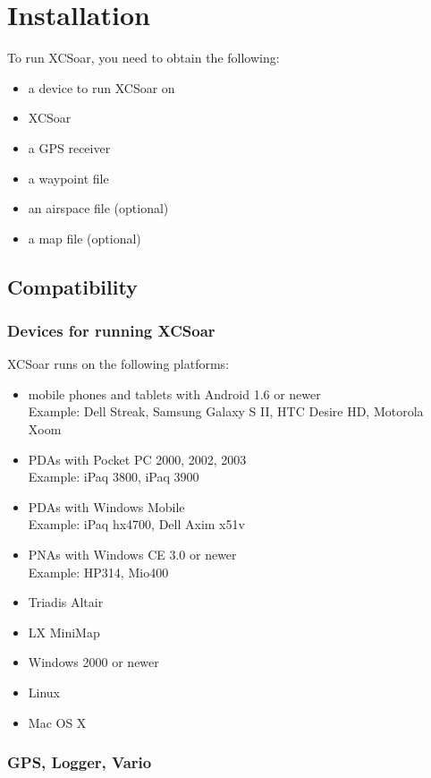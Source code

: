 \chapter{Installation}\label{cha:installation}

To run XCSoar, you need to obtain the following:

\begin{itemize}
\item a device to run XCSoar on
\item XCSoar
\item a GPS receiver
\item a waypoint file
\item an airspace file (optional)
\item a map file (optional)
\end{itemize}

\section{Compatibility}

\subsection*{Devices for running XCSoar}

XCSoar runs on the following platforms:

\begin{itemize}
\item mobile phones and tablets with Android 1.6 or newer \\
  Example: Dell Streak, Samsung Galaxy S II, HTC Desire HD,
  Motorola Xoom
\item PDAs with Pocket PC 2000, 2002, 2003 \\
  Example: iPaq 3800, iPaq 3900
\item PDAs with Windows Mobile \\
  Example: iPaq hx4700, Dell Axim x51v
\item PNAs with Windows CE 3.0 or newer \\
  Example: HP314, Mio400
\item Triadis Altair
\item LX MiniMap
\item Windows 2000 or newer
\item Linux
\item Mac OS X
\end{itemize}

\subsection*{GPS, Logger, Vario}

